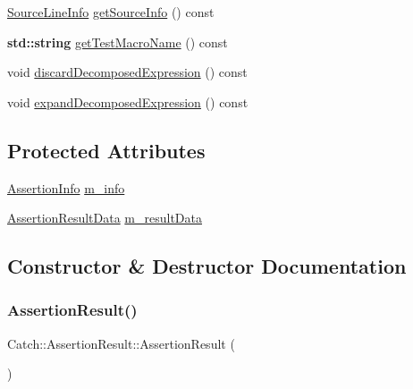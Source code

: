 \begin{DoxyCompactItemize}
\item 
\hyperlink{struct_catch_1_1_source_line_info}{Source\+Line\+Info} \hyperlink{class_catch_1_1_assertion_result_aa4d3fdbfe276a69a035762dbb790800f}{get\+Source\+Info} () const
\item 
\textbf{ std\+::string} \hyperlink{class_catch_1_1_assertion_result_aaefd9a0384282fd08a4a72aa19bd0628}{get\+Test\+Macro\+Name} () const
\item 
void \hyperlink{class_catch_1_1_assertion_result_a406884d8b8209c80078706724c528df5}{discard\+Decomposed\+Expression} () const
\item 
void \hyperlink{class_catch_1_1_assertion_result_ac0b1d268a3ffa1f1fb305cad9435d824}{expand\+Decomposed\+Expression} () const
\end{DoxyCompactItemize}
\subsection*{Protected Attributes}
\begin{DoxyCompactItemize}
\item 
\hyperlink{struct_catch_1_1_assertion_info}{Assertion\+Info} \hyperlink{class_catch_1_1_assertion_result_a3e7236f73a51d6fc8bb9dfdefcee7772}{m\+\_\+info}
\item 
\hyperlink{struct_catch_1_1_assertion_result_data}{Assertion\+Result\+Data} \hyperlink{class_catch_1_1_assertion_result_add3455b8bbedb0d643e18da67c66b4f7}{m\+\_\+result\+Data}
\end{DoxyCompactItemize}


\subsection{Constructor \& Destructor Documentation}
\mbox{\label{class_catch_1_1_assertion_result_a570b999c5f66e33cb31d3adb29fec25b}} 
\subsubsection{\texorpdfstring{Assertion\+Result()}{AssertionResult()}\hspace{0.1cm}{\footnotesize\ttfamily [1/2]}}
{\footnotesize\ttfamily Catch\+::\+Assertion\+Result\+::\+Assertion\+Result (\begin{DoxyParamCaption}{ }\end{DoxyParamCaption})}

